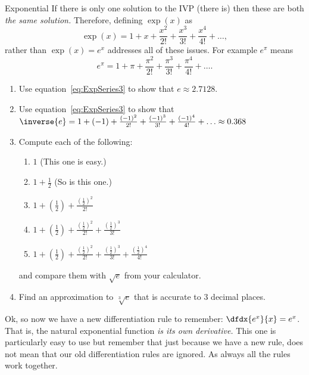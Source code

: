 \begin{mynotation}{Exponential}
If there is only one solution to the IVP (there is) then these are
both \emph{ the same solution.}  Therefore, defining $\exp(x)$ as
\begin{equation}
  \exp(x)=1+x+\frac{x^2}{2!}+\frac{x^3}{3!}+\frac{x^4}{4!}+\ldots,\label{eq:ExpSeries3}
\end{equation}
rather than $\exp(x)=e^x$  addresses all of these issues. For example
$e^\pi$ means
$$
e^\pi=
1+\pi+\frac{\pi^2}{2!}+\frac{\pi^3}{3!}+\frac{\pi^4}{4!}+\ldots.
$$
\begin{embeddedproblem}{}
  \begin{enumerate}[label={\bf{}\alph*)}]
  \item Use equation~\ref{eq:ExpSeries3} to show that $e\approx
    2.7128.$ 
  \item Use equation~\ref{eq:ExpSeries3} to show that
    $\inverse{e}=1+(-1)+\frac{(-1)^2}{2!}+\frac{(-1)^3}{3!}+\frac{(-1)^4}{4!}+\ldots
    \approx 0.368$ 
  \item Compute each of the following:
    \begin{enumerate}[label={\bf{}\roman*.}]
    \item $1$ (This one is easy.)
    \item $1+\frac{1}{2}$ (So is this one.)
    \item $1+(\frac12)+\frac{(\frac12)^2}{2!}$
    \item
      $1+(\frac12)+\frac{(\frac12)^2}{2!}+\frac{(\frac12)^3}{3!}$
    \item $1+(\frac12)+\frac{(\frac12)^2}{2!}+\frac{(\frac12)^3}{3!}+\frac{(\frac12)^4}{4!}$
    \end{enumerate}
    and compare them with $\sqrt{e}$ from your calculator.
  \item Find an approximation to $\sqrt[3]{e}$ that is accurate to
    $3$ decimal places.
  \end{enumerate}
\end{embeddedproblem}

\end{mynotation}

Ok, so now we have a new differentiation rule to remember:
$\dfdx{e^x}{x}=e^x$. That is, the natural exponential function
\emph{is its own derivative.}
This one is particularly easy to use but remember that just because we
have a new rule, does not mean that our old differentiation rules
are ignored.  As always all the rules work together.

